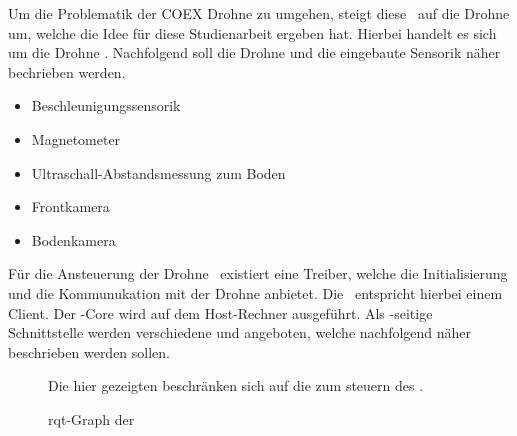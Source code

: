 
Um die Problematik der COEX Drohne zu umgehen, steigt diese \Arbeit\ auf die Drohne um, welche die Idee für diese Studienarbeit ergeben hat.
Hierbei handelt es sich um die Drohne \Ar. Nachfolgend soll die Drohne und die eingebaute Sensorik näher bechrieben werden.


\begin{itemize}
\item Beschleunigungssensorik
\item Magnetometer
\item Ultraschall-Abstandsmessung zum Boden
\item Frontkamera
\item Bodenkamera
\end{itemize}



Für die Ansteuerung der Drohne \Ar\ existiert eine Treiber, welche die Initialisierung und die Kommunukation mit der Drohne anbietet. Die \Ar\ entspricht hierbei einem Client. Der \ROS-Core wird auf dem Host-Rechner ausgeführt.
Als \ROS-seitige Schnittstelle werden verschiedene \Topic[s] und \Service[s] angeboten, welche nachfolgend näher beschrieben werden sollen.


\begin{figure}[ht!]
\vspace{0.25cm}
\begin{center}
\caption{rqt-Graph der \Ar}
\label{fig:rqtRaw}
\end{center}

\vspace{0.25cm}
Die hier gezeigten \Topic[s] beschränken sich auf die \Topic[s] zum steuern des \Quad[s] \Ar.
\end{figure}


